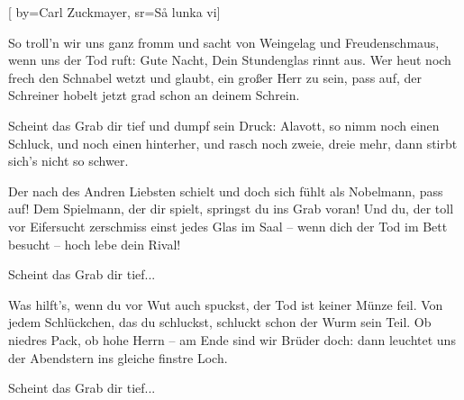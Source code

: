 
[
	by={Carl Zuckmayer},
	sr={Så lunka vi}]
  
\beginverse*                                        
So troll'n wir uns ganz fromm und sacht
von Weingelag und Freudenschmaus,
wenn uns der Tod ruft: Gute Nacht,
Dein Stundenglas rinnt aus.
Wer heut noch frech den Schnabel wetzt
und glaubt, ein großer Herr zu sein,
pass auf, der Schreiner hobelt jetzt
grad schon an deinem Schrein.
\endverse

\beginchorus
Scheint das Grab dir tief und dumpf sein Druck:
Alavott, so nimm noch einen Schluck,
und noch einen hinterher,
und rasch noch zweie, dreie mehr,
dann stirbt sich’s nicht so schwer.
\endchorus

\beginverse*
Der nach des Andren Liebsten schielt
und doch sich fühlt als Nobelmann,
pass auf! Dem Spielmann, der dir spielt,
springst du ins Grab voran!
Und du, der toll vor Eifersucht
zerschmiss einst jedes Glas im Saal –
wenn dich der Tod im Bett besucht –
hoch lebe dein Rival!
\endverse

\beginchorus
Scheint das Grab dir tief...
\endchorus

\beginverse*
Was hilft's, wenn du vor Wut auch spuckst,
der Tod ist keiner Münze feil.
Von jedem Schlückchen, das du schluckst,
schluckt schon der Wurm sein Teil.
Ob niedres Pack, ob hohe Herrn –
am Ende sind wir Brüder doch:
dann leuchtet uns der Abendstern
ins gleiche finstre Loch.
\endverse

\beginchorus
Scheint das Grab dir tief...
\endchorus
\endsong
